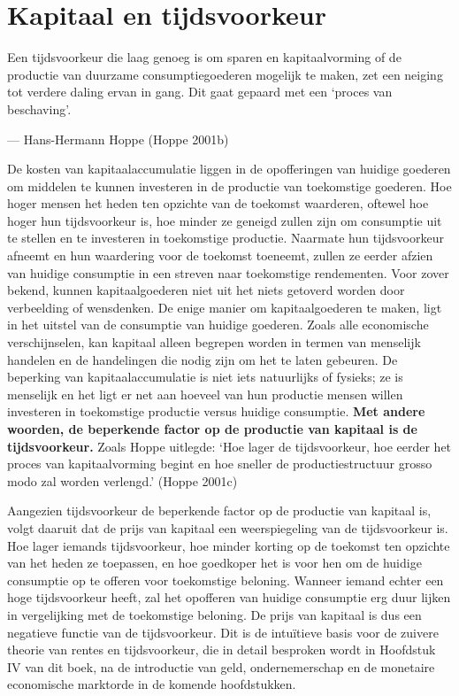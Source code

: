 \documentclass[
  a5paper,
  smalldemyvopaper,11pt,twoside,onecolumn,openright,extrafontsizes,
hidelinks]{memoir}
\begin{document}
\section{Kapitaal en tijdsvoorkeur}\label{kapitaal-en-tijdsvoorkeur}

Een tijdsvoorkeur die laag genoeg is om sparen en kapitaalvorming of de
productie van duurzame consumptiegoederen mogelijk te maken, zet een
neiging tot verdere daling ervan in gang. Dit gaat gepaard met een
`proces van beschaving'.

--- Hans-Hermann Hoppe (Hoppe 2001b)

De kosten van kapitaalaccumulatie liggen in de opofferingen van huidige
goederen om middelen te kunnen investeren in de productie van
toekomstige goederen. Hoe hoger mensen het heden ten opzichte van de
toekomst waarderen, oftewel hoe hoger hun tijdsvoorkeur is, hoe minder
ze geneigd zullen zijn om consumptie uit te stellen en te investeren in
toekomstige productie. Naarmate hun tijdsvoorkeur afneemt en hun
waardering voor de toekomst toeneemt, zullen ze eerder afzien van
huidige consumptie in een streven naar toekomstige rendementen. Voor
zover bekend, kunnen kapitaalgoederen niet uit het niets getoverd worden
door verbeelding of wensdenken. De enige manier om kapitaalgoederen te
maken, ligt in het uitstel van de consumptie van huidige goederen. Zoals
alle economische verschijnselen, kan kapitaal alleen begrepen worden in
termen van menselijk handelen en de handelingen die nodig zijn om het te
laten gebeuren. De beperking van kapitaalaccumulatie is niet iets
natuurlijks of fysieks; ze is menselijk en het ligt er net aan hoeveel
van hun productie mensen willen investeren in toekomstige productie
versus huidige consumptie. \textbf{Met andere woorden, de beperkende
factor op de productie van kapitaal is de tijdsvoorkeur.} Zoals Hoppe
uitlegde: `Hoe lager de tijdsvoorkeur, hoe eerder het proces van
kapitaalvorming begint en hoe sneller de productiestructuur grosso modo
zal worden verlengd.' (Hoppe 2001c)

Aangezien tijdsvoorkeur de beperkende factor op de productie van
kapitaal is, volgt daaruit dat de prijs van kapitaal een weerspiegeling
van de tijdsvoorkeur is. Hoe lager iemands tijdsvoorkeur, hoe minder
korting op de toekomst ten opzichte van het heden ze toepassen, en hoe
goedkoper het is voor hen om de huidige consumptie op te offeren voor
toekomstige beloning. Wanneer iemand echter een hoge tijdsvoorkeur
heeft, zal het opofferen van huidige consumptie erg duur lijken in
vergelijking met de toekomstige beloning. De prijs van kapitaal is dus
een negatieve functie van de tijdsvoorkeur. Dit is de intuïtieve basis
voor de zuivere theorie van rentes en tijdsvoorkeur, die in detail
besproken wordt in Hoofdstuk IV van dit boek, na de introductie van
geld, ondernemerschap en de monetaire economische marktorde in de
komende hoofdstukken.
\end{document}
